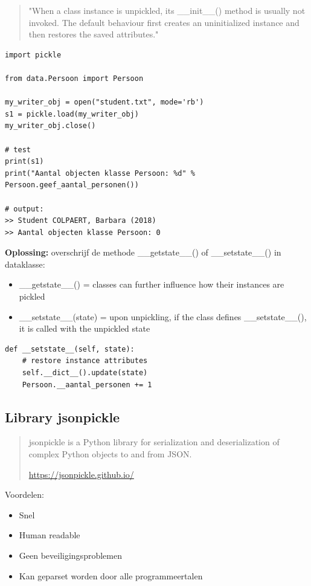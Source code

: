 \documentclass{article}
\begin{document}
\begin{quotation}
"When a class instance is unpickled, its \_\_init\_\_() method is usually not
invoked. The default behaviour first creates an uninitialized instance
and then restores the saved attributes."
\end{quotation}

\begin{verbatim}
import pickle

from data.Persoon import Persoon

my_writer_obj = open("student.txt", mode='rb')
s1 = pickle.load(my_writer_obj)
my_writer_obj.close()

# test
print(s1)
print("Aantal objecten klasse Persoon: %d" % Persoon.geef_aantal_personen())

# output:
>> Student COLPAERT, Barbara (2018)
>> Aantal objecten klasse Persoon: 0
\end{verbatim}

\textbf{Oplossing:} overschrijf de methode \_\_getstate\_\_() of \_\_setstate\_\_() in dataklasse:

\begin{itemize}
    \item \_\_getstate\_\_() = classes can further influence how their instances are pickled 
    \item \_\_setstate\_\_(state) = upon unpickling, if the class defines \_\_setstate\_\_(), it is called with the unpickled state
\end{itemize}

\begin{verbatim}
def __setstate__(self, state):
    # restore instance attributes
    self.__dict__().update(state)
    Persoon.__aantal_personen += 1
\end{verbatim}

\subsection{Library jsonpickle}

\begin{quotation}
    jsonpickle is a Python library for serialization and deserialization of complex
Python objects to and from JSON.

\url{https://jsonpickle.github.io/}
\end{quotation}

Voordelen:

\begin{itemize}
    \item Snel
    \item Human readable
    \item Geen beveiligingsproblemen
    \item Kan geparset worden door alle programmeertalen
\end{itemize}
\end{document}
